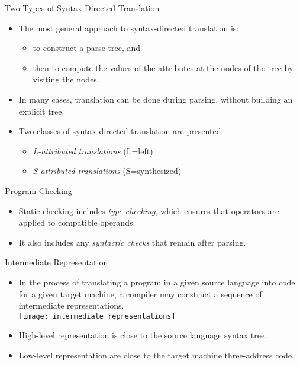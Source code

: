 \begin{bibunit}[apalike]
\begin{frame}{Two Types of Syntax-Directed Translation}
	\begin{itemize}
	\item The most general approach to syntax-directed translation is:
		\begin{itemize}
		\item to construct a parse tree, and
		\item then to compute the values of the attributes at the nodes of the tree by visiting the nodes.
		\end{itemize}
	\vfill
	\item In many cases, translation can be done during parsing, without building an explicit tree.
	\vfill
	\item Two classes of syntax-directed translation are presented:
		\begin{itemize}
		\item \emph{L-attributed translations} (L=left)
		\item \emph{S-attributed translations} (S=synthesized)
		\end{itemize}
	\end{itemize}
\end{frame}

\begin{frame}{Program Checking}
	\begin{itemize}
	\item Static checking includes \emph{type checking}, which ensures that operators are applied to compatible operands.
	\vspace{4em}
	\item It also includes any \emph{syntactic checks} that remain after parsing.
	\end{itemize}
\end{frame}

\begin{frame}{Intermediate Representation}
	\begin{itemize}
	\item In the process of translating a program in a given source language into code for a given target machine, a compiler may construct a sequence of intermediate representations. \\
	\vfill
		\texttt{[image: intermediate\_representations]}
	\vfill
	\item High-level representation is close to the source language \eg syntax tree.
	\item Low-level representation are close to the target machine \eg three-address code.
	\end{itemize}
\end{frame}


\end{bibunit}
